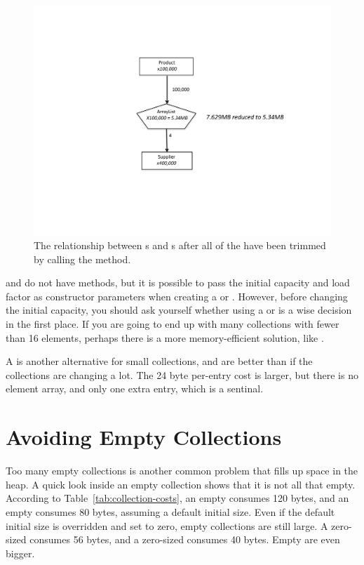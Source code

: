  \begin{figure}
  \centering
 \includegraphics[width=.80\textwidth]{part1/Figures/collections/trimmed-product.pdf}
 \caption{The relationship between s and s after
 all of the
  have been trimmed by calling the  method.}
  \label{fig:trimmed-product}
\end{figure}
 
 and  do not have  methods,
but it is possible to pass the initial capacity and load factor as constructor
parameters when creating a  or . 
However, before changing the initial capacity, you should
ask yourself whether using a  or  is a
wise decision in the first place. If you are going to end up with many
collections with fewer than 16 elements, perhaps there is a more memory-efficient solution, like
.
  
A  is another alternative for small collections, and are
better than  if the collections are changing a lot. The
24 byte per-entry cost is larger, but there is no element array, and only one
extra entry, which is a sentinal.

\section{Avoiding Empty Collections}

Too many empty collections is another common problem that fills up space in the
heap. A quick look inside an empty collection shows that it is not all that
empty. According to Table~\ref{tab:collection-costs}, an empty  consumes
120 bytes, and an empty  consumes 80
bytes, assuming a default initial size. 
Even if the default initial size is overridden and set to zero, empty
collections are still large. A zero-sized  consumes 56 bytes, and a zero-sized
 consumes 40 bytes. Empty  are even bigger.

